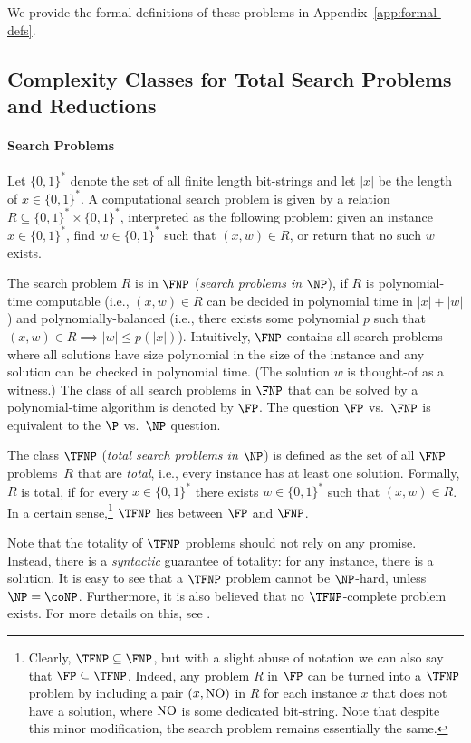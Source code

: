 \documentclass{article}
\theoremstyle{definition}  %
\theoremstyle{plain}
\numberwithin{observation}{section}
\numberwithin{claim}{section}
\numberwithin{fact}{section}
\numberwithin{lemma}{section}
\numberwithin{proposition}{section}
\numberwithin{theorem}{section}
\numberwithin{corollary}{section}
\numberwithin{definition}{section}
\theoremstyle{plain}
\begin{document}
We provide the formal definitions of these problems in Appendix~\ref{app:formal-defs}.

\subsection{Complexity Classes for Total Search Problems and Reductions} \label{sec:prelim_complexity}
\paragraph{\bf Search Problems} Let $\{0,1\}^*$ denote the set of all finite length bit-strings and let $|x|$ be the length of $x \in \{0,1\}^*$. A computational search problem is given by a relation $R \subseteq \{0,1\}^* \times \{0,1\}^*$, interpreted as the following problem: given an instance $x \in \{0,1\}^*$, find $w \in \{0,1\}^*$ such that $(x,w) \in R$, or return that no such $w$ exists.

The search problem $R$ is in $\FNP$ (\emph{search problems in $\NP$}), if $R$ is polynomial-time computable (i.e., $(x,w) \in R$ can be decided in polynomial time in $|x|+|w|$) and polynomially-balanced (i.e., there exists some polynomial $p$ such that $(x,w) \in R \implies |w| \leq p(|x|)$). Intuitively, $\FNP$ contains all search problems where all solutions have size polynomial in the size of the instance and any solution can be checked in polynomial time. (The solution $w$ is thought-of as a witness.) The class of all search problems in $\FNP$ that can be solved by a polynomial-time algorithm is denoted by $\FP$. The question $\FP$ vs.\ $\FNP$ is equivalent to the $\P$ vs.\ $\NP$ question.

The class $\TFNP$ (\emph{total search problems in $\NP$}) is defined as the set of all $\FNP$ problems~$R$ that are \emph{total}, i.e., every instance has at least one solution. Formally, $R$ is total, if for every $x \in \{0,1\}^*$ there exists $w \in \{0,1\}^*$ such that $(x,w) \in R$. In a certain sense,\footnote{Clearly, $\TFNP \subseteq \FNP$, but with a slight abuse of notation we can also say that $\FP \subseteq \TFNP$. Indeed, any problem $R$ in $\FP$ can be turned into a $\TFNP$ problem by including a pair $(x,\textup{NO})$ in $R$ for each instance $x$ that does not have a solution, where $\textup{NO}$ is some dedicated bit-string. Note that despite this minor modification, the search problem remains essentially the same.} $\TFNP$ lies between $\FP$ and $\FNP$.

Note that the totality of $\TFNP$ problems should not rely on any promise. Instead, there is a \emph{syntactic} guarantee of totality: for any instance, there is a solution. It is easy to see that a $\TFNP$ problem cannot be $\NP$-hard, unless $\NP = \coNP$. Furthermore, it is also believed that no $\TFNP$-complete problem exists. For more details on this, see \citep{megiddo1991total}.
\end{document}
